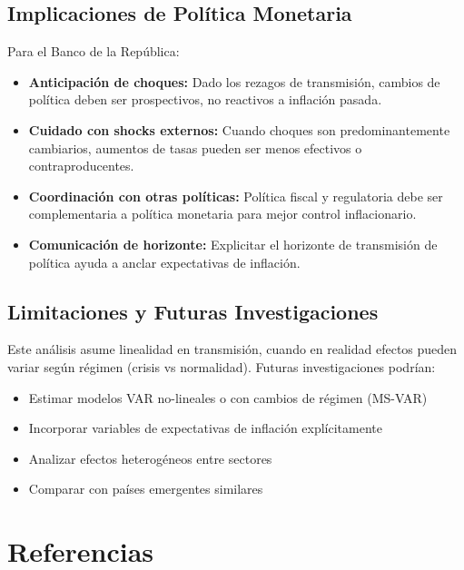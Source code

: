 \documentclass[12pt,a4paper]{article}
\begin{document}
\subsection{Implicaciones de Política Monetaria}

Para el Banco de la República:

\begin{itemize}
\item \textbf{Anticipación de choques:} Dado los rezagos de transmisión, cambios de política deben ser prospectivos, no reactivos a inflación pasada.

\item \textbf{Cuidado con shocks externos:} Cuando choques son predominantemente cambiarios, aumentos de tasas pueden ser menos efectivos o contraproducentes.

\item \textbf{Coordinación con otras políticas:} Política fiscal y regulatoria debe ser complementaria a política monetaria para mejor control inflacionario.

\item \textbf{Comunicación de horizonte:} Explicitar el horizonte de transmisión de política ayuda a anclar expectativas de inflación.
\end{itemize}

\subsection{Limitaciones y Futuras Investigaciones}

Este análisis asume linealidad en transmisión, cuando en realidad efectos pueden variar según régimen (crisis vs normalidad). Futuras investigaciones podrían:

\begin{itemize}
\item Estimar modelos VAR no-lineales o con cambios de régimen (MS-VAR)
\item Incorporar variables de expectativas de inflación explícitamente
\item Analizar efectos heterogéneos entre sectores
\item Comparar con países emergentes similares
\end{itemize}

\section*{Referencias}
\end{document}
